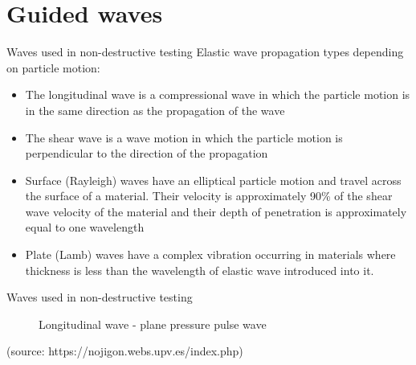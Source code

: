 \documentclass[10pt,aspectratio=169,dvipsnames]{beamer} %
\begin{document}
	\section{Guided waves}
	\begin{frame}{Waves used in non-destructive testing}
		Elastic wave propagation types depending on particle motion:
		\begin{itemize}
			\item  \alert{The longitudinal wave} is a compressional wave in which the particle motion is in the same direction as the propagation of the wave
			\item \alert{The shear wave} is a wave motion in which the particle motion is perpendicular to the direction of the propagation
			\item \alert{Surface (Rayleigh) waves} have an elliptical particle motion and travel across the surface of a material. Their velocity is approximately 90\% of the shear wave velocity of the material and their depth of penetration is approximately equal to one
			wavelength
			\item \alert{Plate (Lamb) waves} have a complex vibration occurring in materials where thickness is less than the wavelength of elastic wave introduced into it.
		\end{itemize}
	\end{frame}
	\setcounter{subfigure}{0}
	\begin{frame}{Waves used in non-destructive testing}
		\begin{figure}
			\caption{\alert{Longitudinal wave} - plane pressure pulse wave}
		\end{figure}
		\tiny 
		(source: https://nojigon.webs.upv.es/index.php)
	\end{frame}
	\setcounter{subfigure}{0}
\end{document}
